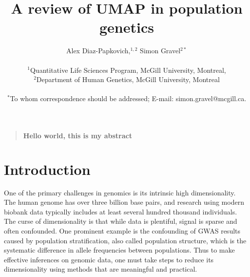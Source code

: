 \documentclass[12pt]{article}
\title{A review of UMAP in population genetics}
\author
{Alex Diaz-Papkovich,$^{1,2}$ Simon Gravel$^{2\ast}$\\
\\
\normalsize{$^{1}$Quantitative Life Sciences Program, McGill University, Montreal,}\\
\normalsize{$^{2}$Department of Human Genetics, McGill University, Montreal}\\
\\
\normalsize{$^\ast$To whom correspondence should be addressed; E-mail:  simon.gravel@mcgill.ca.}
}
\date{}
\newenvironment{sciabstract}{%
\begin{quote} \bf}
{\end{quote}}
\begin{document}
 


\baselineskip24pt


\maketitle 



\begin{sciabstract}
Hello world, this is my abstract
\end{sciabstract}




\section*{Introduction}
One of the primary challenges in genomics is its intrinsic high dimensionality. The human genome has over three billion base pairs, and research using modern biobank data typically includes at least several hundred thousand individuals. The curse of dimensionality is that while data is plentiful, signal is sparse and often confounded. One prominent example is the confounding of GWAS results caused by population stratification, also called population structure, which is the systematic difference in allele frequencies between populations. Thus to make effective inferences on genomic data, one must take steps to reduce its dimensionality using methods that are meaningful and practical. 
\end{document}
